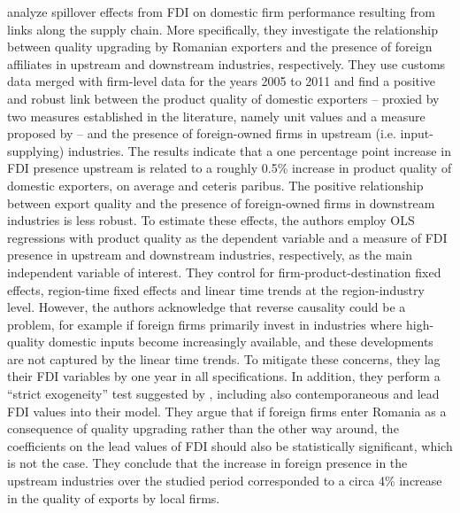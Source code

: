 \cite{bajgar2020climbing} analyze spillover effects from FDI on domestic firm performance resulting from links along the supply chain. More specifically, they investigate the relationship between quality upgrading by Romanian exporters and the presence of foreign affiliates in upstream and downstream industries, respectively. They use customs data merged with firm-level data for the years 2005 to 2011 and find a positive and robust link between the product quality of domestic exporters – proxied by two measures established in the literature, namely unit values and a measure proposed by \cite{khandelwal2013trade} – and the presence of foreign-owned firms in upstream (i.e. input-supplying) industries. The results indicate that a one percentage point increase in FDI presence upstream is related to a roughly 0.5\% increase in product quality of domestic exporters, on average and ceteris paribus. The positive relationship between export quality and the presence of foreign-owned firms in downstream industries is less robust. To estimate these effects, the authors employ OLS regressions with product quality as the dependent variable and a measure of FDI presence in upstream and downstream industries, respectively, as the main independent variable of interest. They control for firm-product-destination fixed effects, region-time fixed effects and linear time trends at the region-industry level. However, the authors acknowledge that reverse causality could be a problem, for example if foreign firms primarily invest in industries where high-quality domestic inputs become increasingly available, and these developments are not captured by the linear time trends. To mitigate these concerns, they lag their FDI variables by one year in all specifications. In addition, they perform a “strict exogeneity” test suggested by \cite{wooldridge2010econometric}, including also contemporaneous and lead FDI values into their model. They argue that if foreign firms enter Romania as a consequence of quality upgrading rather than the other way around, the coefficients on the lead values of FDI should also be statistically significant, which is not the case. They conclude that the increase in foreign presence in the upstream industries over the studied period corresponded to a circa 4\% increase in the quality of exports by local firms. \\ \par

